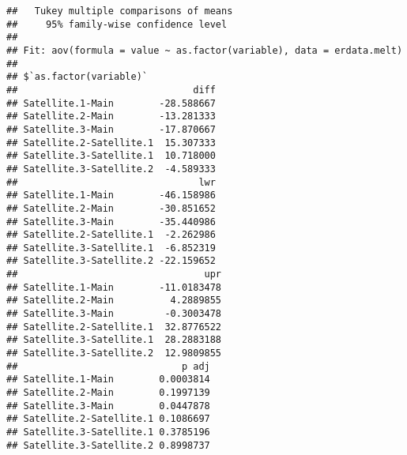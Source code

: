 \documentclass[]{tufte-handout}
\begin{document}
\begin{verbatim}
##   Tukey multiple comparisons of means
##     95% family-wise confidence level
## 
## Fit: aov(formula = value ~ as.factor(variable), data = erdata.melt)
## 
## $`as.factor(variable)`
##                               diff
## Satellite.1-Main        -28.588667
## Satellite.2-Main        -13.281333
## Satellite.3-Main        -17.870667
## Satellite.2-Satellite.1  15.307333
## Satellite.3-Satellite.1  10.718000
## Satellite.3-Satellite.2  -4.589333
##                                lwr
## Satellite.1-Main        -46.158986
## Satellite.2-Main        -30.851652
## Satellite.3-Main        -35.440986
## Satellite.2-Satellite.1  -2.262986
## Satellite.3-Satellite.1  -6.852319
## Satellite.3-Satellite.2 -22.159652
##                                 upr
## Satellite.1-Main        -11.0183478
## Satellite.2-Main          4.2889855
## Satellite.3-Main         -0.3003478
## Satellite.2-Satellite.1  32.8776522
## Satellite.3-Satellite.1  28.2883188
## Satellite.3-Satellite.2  12.9809855
##                             p adj
## Satellite.1-Main        0.0003814
## Satellite.2-Main        0.1997139
## Satellite.3-Main        0.0447878
## Satellite.2-Satellite.1 0.1086697
## Satellite.3-Satellite.1 0.3785196
## Satellite.3-Satellite.2 0.8998737
\end{verbatim}


\end{document}

